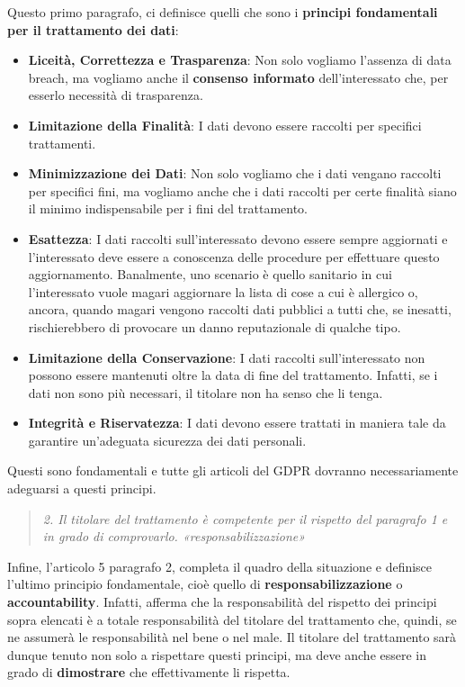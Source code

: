 Questo primo paragrafo, ci definisce quelli che sono i \textbf{principi fondamentali per il trattamento dei dati}:
\begin{itemize}
    \item \textbf{Liceità, Correttezza e Trasparenza}: Non solo vogliamo l'assenza di data breach, ma vogliamo anche il \textbf{consenso informato} dell'interessato che, per esserlo necessità di trasparenza.
    \item \textbf{Limitazione della Finalità}: I dati devono essere raccolti per specifici trattamenti.
    \item \textbf{Minimizzazione dei Dati}: Non solo vogliamo che i dati vengano raccolti per specifici fini, ma vogliamo anche che i dati raccolti per certe finalità siano il minimo indispensabile per i fini del trattamento.
    \item \textbf{Esattezza}: I dati raccolti sull'interessato devono essere sempre aggiornati e l'interessato deve essere a conoscenza delle procedure per effettuare questo aggiornamento. Banalmente, uno scenario è quello sanitario in cui l'interessato vuole magari aggiornare la lista di cose a cui è allergico o, ancora, quando magari vengono raccolti dati pubblici a tutti che, se inesatti, rischierebbero di provocare un danno reputazionale di qualche tipo.
    \item \textbf{Limitazione della Conservazione}: I dati raccolti sull'interessato non possono essere mantenuti oltre la data di fine del trattamento. Infatti, se i dati non sono più necessari, il titolare non ha senso che li tenga.
    \item \textbf{Integrità e Riservatezza}: I  dati devono essere trattati in maniera tale da garantire un'adeguata sicurezza dei dati personali.
\end{itemize}
Questi sono fondamentali e tutte gli articoli del GDPR dovranno necessariamente adeguarsi a questi principi.
\begin{quote}
    \textit{2. Il titolare del trattamento è competente per il rispetto del paragrafo 1 e in grado di comprovarlo. «responsabilizzazione»}
\end{quote}
Infine, l'articolo 5 paragrafo 2, completa il quadro della situazione e definisce l'ultimo principio fondamentale, cioè quello di \textbf{responsabilizzazione} o \textbf{accountability}. Infatti, afferma che la responsabilità del rispetto dei principi sopra elencati è a totale responsabilità del titolare del trattamento che, quindi, se ne assumerà le responsabilità nel bene o nel male.
Il titolare del trattamento sarà dunque tenuto non solo a rispettare questi principi, ma deve anche essere in grado di \textbf{dimostrare} che effettivamente li rispetta.

